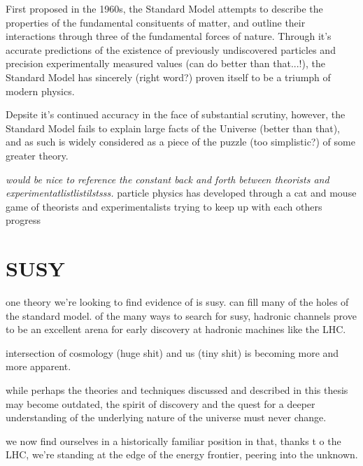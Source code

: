 First proposed in the 1960s, the Standard Model attempts to describe the
properties of the fundamental consituents of matter, and outline their
interactions through three of the fundamental forces of nature. Through it's
accurate predictions of the existence of previously undiscovered particles and
precision experimentally measured values (can do better than that...!), the
Standard Model has sincerely (right word?) proven itself to be a triumph of
modern physics.

Depsite it's continued accuracy in the face of substantial scrutiny, however,
the Standard Model fails to explain large facts of the Universe (better than
that), and as such is widely considered as a piece of the puzzle (too
simplistic?) of some greater theory. 

\emph{would be nice to reference the constant back and forth between theorists
and experimentatlistlistilstsss.}
particle physics has developed through a cat and mouse game of theorists and
experimentalists trying to keep up with each others progress

\section{SUSY}
one theory we're looking to find evidence of is susy. can fill many of the holes
of the standard model.
of the many ways to search for susy, hadronic channels prove to be an excellent
arena for early discovery at hadronic machines like the LHC.

intersection of cosmology (huge shit) and us (tiny shit) is becoming more and
more apparent.

while perhaps the theories and techniques discussed and described in this thesis
may become outdated, the spirit of discovery and the quest for a deeper
understanding of the underlying nature of the universe must never change.

we now find ourselves in a historically familiar position in that, thanks t
o the LHC, we're standing
at the edge of the energy frontier, peering into the unknown.
